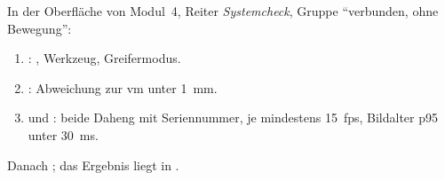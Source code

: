 In der Oberfläche von Modul~4, Reiter \emph{Systemcheck}, Gruppe \enquote{verbunden, ohne
Bewegung}:
\begin{enumerate}
  \item {}: ,
    Werkzeug, Greifermodus.
  \item {}: Abweichung zur \acs{vm} unter
    \SI{1}{\milli\metre}.
  \item {} und : beide Daheng mit
    Seriennummer, je mindestens \SI{15}{fps}, Bildalter p95 unter \SI{30}{\milli\second}.
\end{enumerate}
Danach ; das Ergebnis liegt in .
